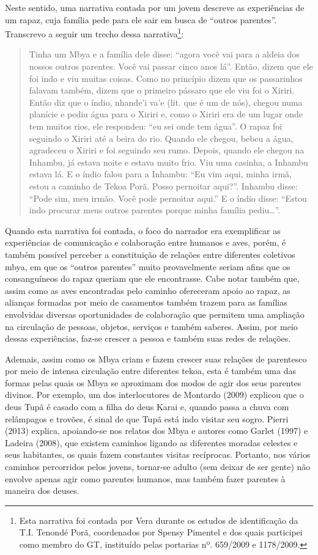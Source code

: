 Neste sentido, uma narrativa contada por um jovem descreve as
experiências de um rapaz, cuja família pede para ele sair em busca de
``outros parentes''. Transcrevo a seguir um trecho dessa
narrativa\footnote{Esta narrativa foi contada por Vera durante os
estudos de identificação da T.I. Tenondé Porã, coordenados por Spensy
Pimentel e dos quais participei como membro do GT, instituído pelas
portarias nº. 659/2009 e 1178/2009.}: 

\begin{quotation}
Tinha um Mbya e a família dele disse: ``agora você vai para a aldeia dos
nossos outros parentes. Você vai passar cinco anos lá''. Então, dizem
que ele foi indo e viu muitas coisas. Como no princípio dizem que os
passarinhos falavam também, dizem que o primeiro pássaro que ele viu
foi o Xiriri. Então diz que o índio, nhande’i va’e (lit. que é um de
nós), chegou numa planície e pediu água para o Xiriri e, como o Xiriri
era de um lugar onde tem muitos rios, ele respondeu: ``eu sei onde tem
água''. O rapaz foi seguindo o Xiriri até a beira do rio. Quando ele
chegou, bebeu a água, agradeceu o Xiriri e foi seguindo seu rumo.
Depois, quando ele chegou na Inhambu, já estava noite e estava muito
frio. Viu uma casinha, a Inhambu estava lá. E o índio falou para a
Inhambu: ``Eu vim aqui, minha irmã, estou a caminho de Tekoa Porã. Posso
pernoitar aqui?''. Inhambu disse: ``Pode sim, meu irmão. Você pode
pernoitar aqui.'' E o índio disse: ``Estou indo procurar meus outros
parentes porque minha família pediu\ldots{}''. 

\end{quotation}
Quando esta narrativa foi contada, o foco do narrador era exemplificar
as experiências de comunicação e colaboração entre humanos e aves,
porém, é também possível perceber a constituição de relações entre
diferentes coletivos mbya, em que os ``outros parentes'' muito
provavelmente seriam afins que os consanguíneos do rapaz queriam que
ele encontrasse. Cabe notar também que, assim como as aves encontradas
pelo caminho ofereceram apoio ao rapaz, as alianças formadas por meio
de casamentos também trazem para as famílias envolvidas diversas
oportunidades de colaboração que permitem uma ampliação na circulação
de pessoas, objetos, serviços e também saberes. Assim, por meio dessas
experiências, faz-se crescer a pessoa e também suas redes de relações.

Ademais, assim como os Mbya criam e fazem crescer suas relações de
parentesco por meio de intensa circulação entre diferentes tekoa, esta
é também uma das formas pelas quais os Mbya se aproximam dos modos de
agir dos seus parentes divinos. Por exemplo, um dos interlocutores de
Montardo (2009) explicou que o deus Tupã é casado com a filha do deus
Karai e, quando passa a chuva com relâmpagos e trovões, é sinal de que
Tupã está indo visitar seu sogro. Pierri (2013) explica, apoiando-se
nos relatos dos Mbya e autores como Garlet (1997) e Ladeira (2008), que
existem caminhos ligando as diferentes moradas celestes e seus
habitantes, os quais fazem constantes visitas recíprocas. Portanto, nos
vários caminhos percorridos pelos jovens, tornar-se adulto (sem deixar
de ser gente) não envolve apenas agir como parentes humanos, mas também
fazer parentes à maneira dos deuses.

